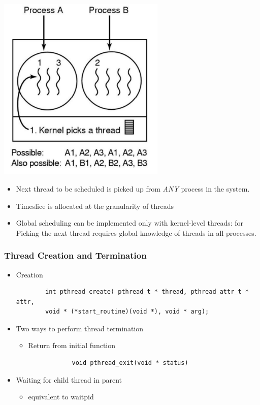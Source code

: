 \documentclass[12pt]{article}
\begin{document}
\newline
\includegraphics[width=0.6\textwidth]{GlobalThreadScheduling.png}
\begin{itemize}
    \item Next thread to be scheduled is picked up from \emph{ANY} process in the system. 
    \item Timeslice is allocated at the granularity of threads 
    \item Global scheduling can be implemented only with kernel-level threads: for Picking the next thread requires global knowledge of threads in all processes.
\end{itemize}
\subsubsection{Thread Creation and Termination}
\begin{itemize}
    \item Creation \begin{lstlisting}
        int pthread_create( pthread_t * thread, pthread_attr_t * attr,
        void * (*start_routine)(void *), void * arg);
    \end{lstlisting}
    \item Two ways to perform thread termination \begin{itemize}
        \item Return from initial function \begin{lstlisting}
            void pthread_exit(void * status)
        \end{lstlisting}
    \end{itemize}
    \item Waiting for child thread in parent \begin{itemize}
        \begin{lstlisting}
            pthread_join()
        \end{lstlisting}
        \item equivalent to waitpid
    \end{itemize}
\end{itemize}
\end{document}
